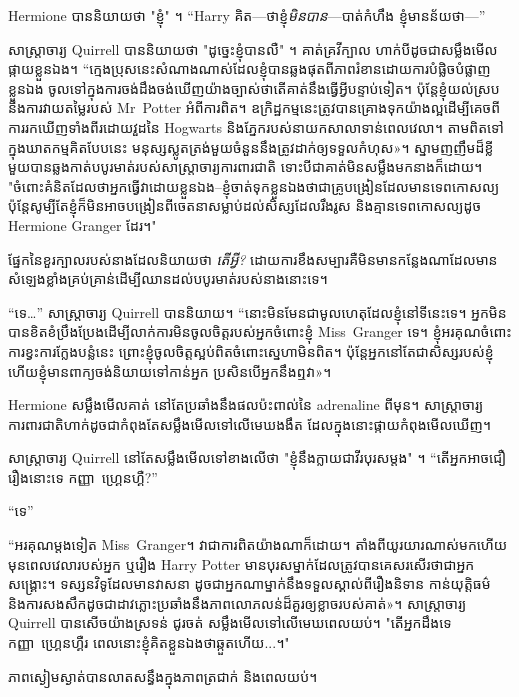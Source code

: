 {{Hermione បាននិយាយថា "ខ្ញុំ" ។ “Harry គិត—ថាខ្ញុំ\emph{មិនបាន}—បាត់កំហឹង ខ្ញុំមានន័យថា—”

សាស្រ្តាចារ្យ Quirrell បាននិយាយថា "ដូច្នេះខ្ញុំបានលឺ" ។ គាត់គ្រវីក្បាល ហាក់បីដូចជាសម្លឹងមើលផ្កាយខ្លួនឯង។ “ក្មេងប្រុសនេះសំណាងណាស់ដែលខ្ញុំបានឆ្លងផុតពីភាពរំខានដោយការបំផ្លិចបំផ្លាញខ្លួនឯង ចូលទៅក្នុងការចង់ដឹងចង់ឃើញយ៉ាងច្បាស់ថាតើគាត់នឹងធ្វើអ្វីបន្ទាប់ទៀត។ ប៉ុន្តែខ្ញុំយល់ស្របនឹងការវាយតម្លៃរបស់ Mr~Potter អំពីការពិត។ ឧក្រិដ្ឋកម្មនេះត្រូវបានគ្រោងទុកយ៉ាងល្អដើម្បីគេចពីការរកឃើញទាំងពីរដោយវួដនៃ Hogwarts និងភ្នែករបស់នាយកសាលាទាន់ពេលវេលា។ តាម​ពិត​ទៅ​ក្នុង​ឃាតកម្ម​គិត​បែប​នេះ មនុស្ស​ស្លូតត្រង់​មួយ​ចំនួន​នឹង​ត្រូវ​ដាក់​ឲ្យ​ទទួល​កំហុស»។ ស្នាមញញឹមដ៏ខ្លីមួយបានឆ្លងកាត់បបូរមាត់របស់សាស្ត្រាចារ្យការពារជាតិ ទោះបីជាគាត់មិនសម្លឹងមកនាងក៏ដោយ។ "ចំពោះគំនិតដែលថាអ្នកធ្វើវាដោយខ្លួនឯង--ខ្ញុំចាត់ទុកខ្លួនឯងថាជាគ្រូបង្រៀនដែលមានទេពកោសល្យ ប៉ុន្តែសូម្បីតែខ្ញុំក៏មិនអាចបង្រៀនពីចេតនាសម្លាប់ដល់សិស្សដែលរឹងរូស និងគ្មានទេពកោសល្យដូច Hermione Granger ដែរ។"

ផ្នែកនៃខួរក្បាលរបស់នាងដែលនិយាយថា \emph{តើអ្វី?} ដោយការខឹងសម្បារគឺមិនមានកន្លែងណាដែលមានសំឡេងខ្លាំងគ្រប់គ្រាន់ដើម្បីឈានដល់បបូរមាត់របស់នាងនោះទេ។

“ទេ…” សាស្ត្រាចារ្យ Quirrell បាននិយាយ។ “នោះមិនមែនជាមូលហេតុដែលខ្ញុំនៅទីនេះទេ។ អ្នកមិនបានខិតខំប្រឹងប្រែងដើម្បីលាក់ការមិនចូលចិត្តរបស់អ្នកចំពោះខ្ញុំ Miss~Granger ទេ។ ខ្ញុំ​អរគុណ​ចំពោះ​ការ​ខ្វះ​ការ​ក្លែង​បន្លំ​នេះ ព្រោះ​ខ្ញុំ​ចូលចិត្ត​ស្អប់​ពិត​ចំពោះ​ស្នេហា​មិន​ពិត។ ប៉ុន្តែ​អ្នក​នៅ​តែ​ជា​សិស្ស​របស់​ខ្ញុំ ហើយ​ខ្ញុំ​មាន​ពាក្យ​ចង់​និយាយ​ទៅ​កាន់​អ្នក ប្រសិន​បើ​អ្នក​នឹង​ឮ​វា»។

Hermione សម្លឹងមើលគាត់ នៅតែប្រឆាំងនឹងផលប៉ះពាល់នៃ adrenaline ពីមុន។ សាស្ត្រាចារ្យ​ការពារ​ជាតិ​ហាក់​ដូច​ជា​កំពុង​តែ​សម្លឹង​មើល​ទៅ​លើ​មេឃ​ងងឹត ដែល​ក្នុង​នោះ​ផ្កាយ​កំពុង​មើល​ឃើញ​។

សាស្ត្រាចារ្យ Quirrell នៅតែសម្លឹងមើលទៅខាងលើថា "ខ្ញុំនឹងក្លាយជាវីរបុរសម្តង" ។ “តើ​អ្នក​អាច​ជឿ​រឿង​នោះ​ទេ កញ្ញា~ហ្គ្រេនហ្គឺ?”

“ទេ”

“អរគុណម្តងទៀត Miss~Granger។ វាជាការពិតយ៉ាងណាក៏ដោយ។ តាំងពីយូរយារណាស់មកហើយ មុនពេលវេលារបស់អ្នក ឬរឿង Harry Potter មានបុរសម្នាក់ដែលត្រូវបានគេសរសើរថាជាអ្នកសង្គ្រោះ។ ទស្សនវិទូ​ដែល​មាន​វាសនា ដូច​ជា​អ្នក​ណា​ម្នាក់​នឹង​ទទួល​ស្គាល់​ពី​រឿងនិទាន កាន់​យុត្តិធម៌ និង​ការ​សងសឹក​ដូច​ជា​ដាវ​ភ្លោះ​ប្រឆាំង​នឹង​ភាព​លោភលន់​ដ៏​គួរ​ឲ្យ​ខ្លាច​របស់​គាត់»។ សាស្ត្រាចារ្យ Quirrell បានសើចយ៉ាងស្រទន់ ជូរចត់ សម្លឹងមើលទៅលើមេឃពេលយប់។ "តើអ្នកដឹងទេ កញ្ញា~ហ្គ្រេនហ្គឺរ ពេលនោះខ្ញុំគិតខ្លួនឯងថាឆ្កួតហើយ...។"

ភាពស្ងៀមស្ងាត់បានលាតសន្ធឹងក្នុងភាពត្រជាក់ និងពេលយប់។

}}
